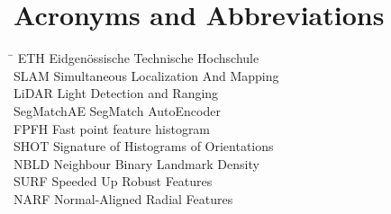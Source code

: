 \section*{Acronyms and Abbreviations}
\begin{tabbing}
 \hspace*{2.6cm}  \= \kill
 ETH \> Eidgenössische Technische Hochschule \\[0.5ex]
 SLAM \> Simultaneous Localization And Mapping \\[0.5ex]
 LiDAR \> Light Detection and Ranging \\[0.5ex]
 SegMatchAE \> SegMatch AutoEncoder \\[0.5ex]
 FPFH \> Fast point feature histogram\\[0.5ex]
 SHOT \> Signature of Histograms of Orientations\\[0.5ex]
 NBLD \> Neighbour Binary Landmark Density\\[0.5ex]
 SURF \> Speeded Up Robust Features\\[0.5ex]
 NARF \> Normal-Aligned Radial Features\\[0.5ex]
\end{tabbing}
